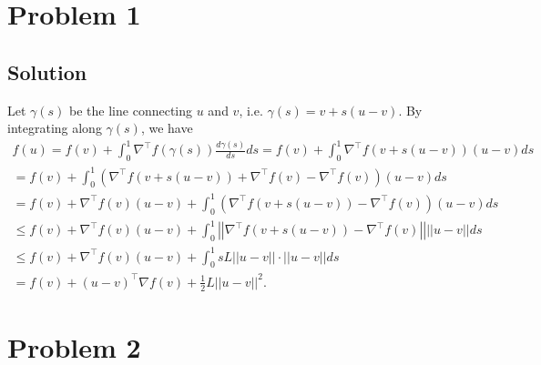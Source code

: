 \documentclass[11pt]{report}
\newcommand{\T}{\intercal}
\begin{document}

\section*{Problem 1}
\subsection*{Solution}
Let $\gamma(s)$ be the line connecting $u$ and $v$, i.e. $\gamma(s) = v + s(u-v)$. By integrating along $\gamma(s)$, we have
\begin{multline*}
  f(u) = f(v) + \int_{0}^{1} \nabla^\T f(\gamma(s)) \frac{d\gamma(s)}{ds} ds = f(v) + \int_{0}^{1} \nabla^\T f(v+s(u-v)) (u-v) ds \\= f(v) + \int_{0}^{1} \left(\nabla^\T f(v+s(u-v)) + \nabla^\T f(v) - \nabla^\T f(v)\right) (u-v) ds \\= f(v) + \nabla^\T f(v) (u-v) + \int_{0}^{1} \left(\nabla^\T f(v+s(u-v)) - \nabla^\T f(v)\right) (u-v) ds \\\leq f(v) + \nabla^\T f(v) (u-v) + \int_{0}^{1} \left||\nabla^\T f(v+s(u-v)) - \nabla^\T f(v)|\right| \left||u-v|\right| ds \\\leq f(v) + \nabla^\T f(v) (u-v) + \int_{0}^{1} sL\left||u-v|\right| \cdot \left||u-v|\right| ds \\= f(v) + (u-v)^\T \nabla f(v) + \frac{1}{2} L\left||u-v|\right|^2.
\end{multline*}
\section*{Problem 2}
\end{document}
